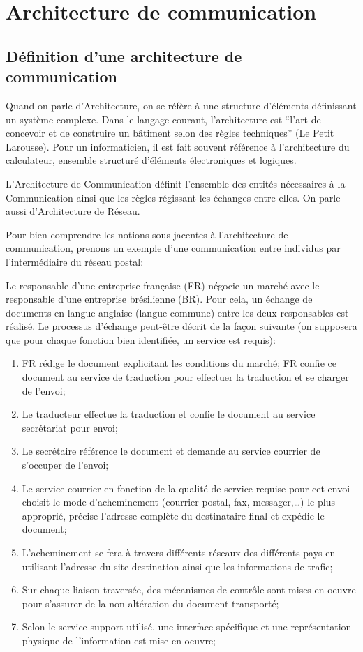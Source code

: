 \chapter{Architecture de communication}


	\section{Définition d'une architecture de communication}
Quand on parle d'Architecture, on se réfère à une structure d'éléments définissant un système complexe. Dans le langage courant, l'architecture est ``l'art de concevoir et de construire un bâtiment selon des règles techniques'' (Le Petit Larousse). Pour un informaticien, il est fait souvent référence à l'architecture du calculateur, ensemble structuré d'éléments électroniques et logiques.

L'Architecture de Communication définit l'ensemble des entités nécessaires à la Communication ainsi que les règles régissant les échanges entre elles. On parle aussi d'Architecture de Réseau.

Pour bien comprendre les notions sous-jacentes à l'architecture de communication, prenons un exemple d'une communication entre individus par l'intermédiaire du réseau postal:

Le responsable d'une entreprise française (FR) négocie un marché avec le responsable d'une entreprise brésilienne (BR). Pour cela, un échange de documents en langue anglaise (langue commune) entre les deux responsables est réalisé. Le processus d'échange peut-être décrit de la façon suivante (on supposera que pour chaque fonction bien identifiée, un service est requis):
\begin{enumerate}
\item FR rédige le document explicitant les conditions du marché; FR confie ce document au service de traduction pour effectuer la traduction et se charger de l'envoi;
\item Le traducteur effectue la traduction et confie le document au service secrétariat pour envoi;
\item Le secrétaire référence le document et demande au service courrier de s'occuper de l'envoi;
\item Le service courrier en fonction de la qualité de service requise pour cet envoi choisit le mode d'acheminement (courrier postal, fax, messager,\ldots)  le plus approprié, précise l'adresse complète du destinataire final et expédie le document;
\item L'acheminement se fera à travers différents réseaux des différents pays en utilisant l'adresse du site destination ainsi que les informations de trafic;
\item Sur chaque liaison traversée, des mécanismes de contrôle sont mises en oeuvre pour s'assurer de la non altération du document transporté;
\item Selon le service support utilisé, une interface spécifique et une représentation physique de l'information est mise en oeuvre;
\end{enumerate}

